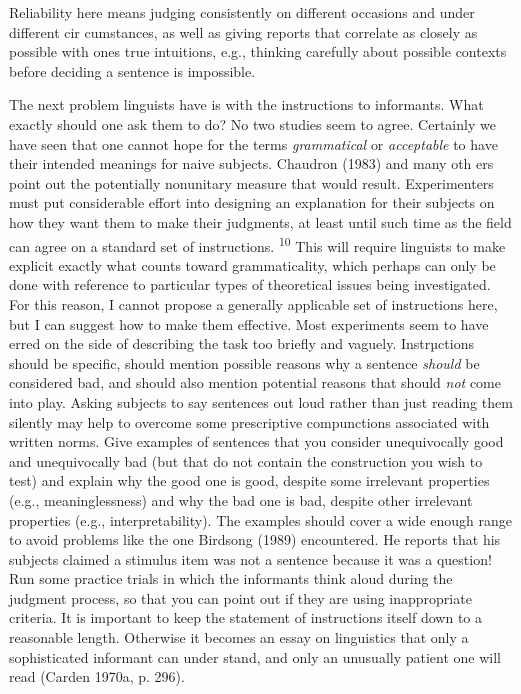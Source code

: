 \setcounter{listWWNumxxleveli}{1}
\begin{listWWNumxxleveli}
\item 
\begin{styleStandard}
Reliability here means judging consistently on different occasions and under different cir\- cumstances, as well as giving reports that correlate as closely as possible with one{\textquotesingle}s true intuitions, e.g., thinking carefully about possible contexts before deciding a sentence is impossible.
\end{styleStandard}


\end{listWWNumxxleveli}
\clearpage\setcounter{page}{1}\begin{styleStandard}
The next problem linguists have is with the instructions to informants. What exactly should one ask them to do? No two studies seem to agree. Certainly we have seen that one cannot hope for the terms \textit{grammatical}\textit{ }or \textit{acceptable}\textit{ }to have their intended meanings for naive subjects. Chaudron (1983) and many oth\- ers point out the potentially nonunitary measure that would result. Experimenters must put considerable effort into designing an explanation for their subjects on how they want them to make their judgments, at least until such time as the field can agree on a standard set of instructions. \textsuperscript{10}\textsuperscript{ }This will require linguists to make explicit exactly what counts toward grammaticality, which perhaps can only be done with reference to particular types of theoretical issues being investigated. For this reason, I cannot propose a generally applicable set of instructions here, but I can suggest how to make them effective. Most experiments seem to have erred on the side of describing the task too briefly and vaguely. Instrµctions should be specific, should mention possible reasons why a sentence \textit{should}\textit{ }be considered bad, and should also mention potential reasons that should \textit{not}\textit{ }come into play. Asking subjects to say sentences out loud rather than just reading them silently may help to overcome some prescriptive compunctions associated with written norms. Give examples of sentences that you consider unequivocally good and unequivocally bad (but that do not contain the construction you wish to test) and explain why the good one is good, despite some irrelevant properties (e.g., meaninglessness) and why the bad one is bad, despite other irrelevant properties (e.g., interpretability). The examples should cover a wide enough range to avoid problems like the one Birdsong (1989) encountered. He reports that his subjects claimed a stimulus item was not a sentence because it was a question! Run some practice trials in which the informants think aloud during the judgment process, so that you can point out if they are using inappropriate criteria. It is important to keep the statement of instructions itself down to a reasonable length. Otherwise it {\textquotedbl}becomes an essay on linguistics that only a sophisticated informant can under\- stand, and only an unusually patient one will read{\textquotedbl} (Carden 1970a, p. 296).
\end{styleStandard}


